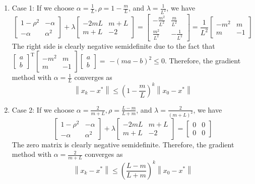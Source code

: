 \documentclass[11pt,a4paper]{article}
\begin{document}
\begin{enumerate}[$\bullet$]
    \item Case 1: If we choose $\alpha=\frac{1}{L}, \rho=1-\frac{m}{L}$, and $\lambda=\frac{1}{L^{2}}$, we have
    $$
    \left[\begin{array}{cc}
    1-\rho^{2} & -\alpha \\
    -\alpha & \alpha^{2}
    \end{array}\right]+\lambda\left[\begin{array}{cc}
    -2 m L & m+L \\
    m+L & -2
    \end{array}\right]=\left[\begin{array}{cc}
    -\frac{m^{2}}{L^{2}} & \frac{m}{L^{2}} \\
    \frac{m^{2}}{L^{2}} & -\frac{1}{L^{2}}
    \end{array}\right]=\frac{1}{L^{2}}\left[\begin{array}{cc}
    -m^{2} & m \\
    m & -1
    \end{array}\right]
    $$
    The right side is clearly negative semidefinite due to the fact that $\left[\begin{array}{l}a \\ b\end{array}\right]^{\mathrm{T}}\left[\begin{array}{cc}-m^{2} & m \\ m & -1\end{array}\right]\left[\begin{array}{l}a \\ b\end{array}\right]=$ $-(m a-b)^{2} \leq 0 .$ Therefore, the gradient method with $\alpha=\frac{1}{L}$ converges as
    $$
    \left\|x_{k}-x^{*}\right\| \leq\left(1-\frac{m}{L}\right)^{k}\left\|x_{0}-x^{*}\right\|
    $$
    \item Case 2: If we choose $\alpha=\frac{2}{m+L}, \rho=\frac{L-m}{L+m}$, and $\lambda=\frac{2}{(m+L)^{2}}$, we have
    $$
    \left[\begin{array}{cc}
    1-\rho^{2} & -\alpha \\
    -\alpha & \alpha^{2}
    \end{array}\right]+\lambda\left[\begin{array}{cc}
    -2 m L & m+L \\
    m+L & -2
    \end{array}\right]=\left[\begin{array}{ll}
    0 & 0 \\
    0 & 0
    \end{array}\right]
    $$
    The zero matrix is clearly negative semidefinite. Therefore, the gradient method with $\alpha=\frac{2}{m+L}$ converges as
    $$
    \left\|x_{k}-x^{*}\right\| \leq\left(\frac{L-m}{L+m}\right)^{k}\left\|x_{0}-x^{*}\right\|
    $$
\end{enumerate}
\end{document}
